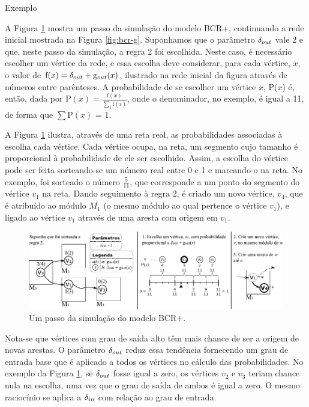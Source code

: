 \begin{section}{Exemplo}

A Figura \ref{fig:bcr-passo} mostra um passo da simulação do modelo BCR+, continuando a rede inicial mostrada na Figura \ref{fig:bcr-g}. Suponhamos que o parâmetro $\delta_{out}$ vale $2$ e que, neste passo da simulação, a regra 2 foi escolhida. Neste caso, é necessário escolher um vértice da rede, e essa escolha deve considerar, para cada vértice, $x$, o valor de $\mathrm{f}(x) = \delta_{out} + \mathrm{g}_{out}(x)$, ilustrado na rede inicial da figura através de números entre parênteses. A probabilidade de se escolher um vértice $x$, P($x$) é, então, dada por $\mathrm{P}(x) = \frac{\mathrm{f}(x)}{\sum_i \mathrm{f}(i)}$, onde o denominador, no exemplo, é igual a 11, de forma que $\sum \mathrm{P}(x)$ = 1. 

A Figura \ref{fig:bcr-passo} ilustra, através de uma reta real, as probabilidades associadas à escolha cada vértice. Cada vértice ocupa, na reta, um segmento cujo tamanho é proporcional à probabilidade de ele ser escolhido. Assim, a escolha do vértice pode ser feita sorteando-se um número real entre 0 e 1 e marcando-o na reta. No exemplo, foi sorteado o número $\frac{5}{11}$, que corresponde a um ponto do segmento do vértice $v_1$ na reta. Dando seguimento à regra 2, é criado um novo vértice, $v_4$, que é atribuído ao módulo $M_1$ (o mesmo módulo ao qual pertence o vértice $v_1$), e ligado ao vértice $v_1$ através de uma aresta com origem em $v_1$.


\begin{figure}[htbp]
	\centering
		\includegraphics[scale=1]{figuras/bcr-passo}
	\caption{Um passo da simulação do modelo BCR+.}
	\label{fig:bcr-passo}
\end{figure}

Nota-se que vértices com grau de saída alto têm mais chance de ser a origem de novas arestas. O parâmetro $\delta_{out}$ reduz essa tendência fornecendo um grau de entrada base que é aplicado a todos os vértices no cálculo das probabilidades. No exemplo da Figura \ref{fig:bcr-passo}, se $\delta_{out}$ fosse igual a zero, os vértices $v_2$ e $v_3$ teriam chance nula na escolha, uma vez que o grau de saída de ambos é igual a zero. O mesmo raciocínio se aplica a $\delta_{in}$ com relação ao grau de entrada.


\end{section}
